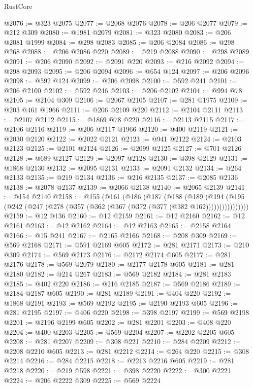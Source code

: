 \begin{lexlean}{RustCore}
\begin{coremodule}
@2076 := @323 @2075
@2077 := @2068 @2076
@2078 := @206 @2077
@2079 := @212 @309
@2080 := @1981 @2079
@2081 := @323 @2080
@2083 := @206 @2081 @1999
@2084 := @298 @2083
@2085 := @206 @2084
@2086 := @298 @268
@2088 := @206 @2086 @220
@2089 := @219 @2088
@2090 := @298 @2089
@2091 := @206 @2090
@2092 := @2091 @220
@2093 := @216 @2092
@2094 := @298 @2093
@2095 := @206 @2094
@2096 := @654 @124
@2097 := @206 @2096
@2098 := @592 @124
@2099 := @206 @2098
@2100 := @592 @241
@2101 := @206 @2100
@2102 := @592 @246
@2103 := @206 @2102
@2104 := @994 @78
@2105 := @2104 @309
@2106 := @2067 @2105
@2107 := @281 @1975
@2109 := @203 @461 @1966
@2111 := @206 @2109 @220
@2112 := @2104 @2111
@2113 := @2107 @2112
@2115 := @1869 @78 @220
@2116 := @2113 @2115
@2117 := @2106 @2116
@2119 := @206 @2117 @1966
@2120 := @400 @2119
@2121 := @2030 @2120
@2122 := @2022 @2121
@2123 := @941 @2122
@2124 := @2103 @2123
@2125 := @2101 @2124
@2126 := @2099 @2125
@2127 := @701 @2126
@2128 := @689 @2127
@2129 := @2097 @2128
@2130 := @398 @2129
@2131 := @1868 @2130
@2132 := @2095 @2131
@2133 := @2091 @2132
@2134 := @264 @2133
@2135 := @219 @2134
@2136 := @216 @2135
@2137 := @2085 @2136
@2138 := @2078 @2137
@2139 := @2066 @2138
@2140 := @2065 @2139
@2141 := @154 @2140
@2158 := @155
    (@161
      (@186
        (@187
          (@188
            (@189
              (@194 (@195 (@242 (@247 (@278 (@357 (@362 (@367 (@372 (@377 (@382 @162))))))))))))))))
@2159 := @12 @136
@2160 := @12 @2159
@2161 := @12 @2160
@2162 := @12 @2161
@2163 := @12 @2162
@2164 := @12 @2163
@2165 := @2158 @2164
@2166 := @15 @241
@2167 := @2165 @2166
@2168 := @208 @309
@2169 := @569 @2168
@2171 := @591 @2169 @605
@2172 := @281 @2171
@2173 := @210 @309
@2174 := @569 @2173
@2176 := @2172 @2174 @605
@2177 := @281 @2176
@2178 := @569 @2079
@2180 := @2177 @2178 @605
@2181 := @281 @2180
@2182 := @214 @267
@2183 := @569 @2182
@2184 := @281 @2183
@2185 := @402 @220
@2186 := @216 @2185
@2187 := @569 @2186
@2189 := @2184 @2187 @605
@2190 := @281 @2189
@2191 := @404 @220
@2192 := @1868 @2191
@2193 := @569 @2192
@2195 := @2190 @2193 @605
@2196 := @281 @2195
@2197 := @406 @220
@2198 := @398 @2197
@2199 := @569 @2198
@2201 := @2196 @2199 @605
@2202 := @281 @2201
@2203 := @408 @220
@2204 := @400 @2203
@2205 := @569 @2204
@2207 := @2202 @2205 @605
@2208 := @281 @2207
@2209 := @308 @221
@2210 := @284 @2209
@2212 := @2208 @2210 @605
@2213 := @281 @2212
@2214 := @264 @220
@2215 := @308 @2214
@2216 := @284 @2215
@2218 := @2213 @2216 @605
@2219 := @281 @2218
@2220 := @219 @598
@2221 := @398 @2220
@2222 := @300 @2221
@2224 := @206 @2222 @309
@2225 := @569 @2224

\end{coremodule}
\end{lexlean}
